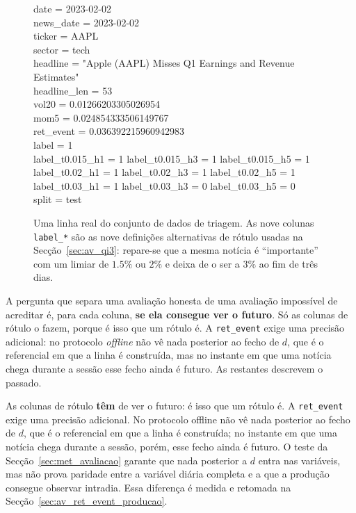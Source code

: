 \begin{figure}[ht]
\centering
\begin{tcolorbox}[colback=black!3, colframe=black!30, boxrule=0.4pt, arc=2pt,
                  width=0.96\textwidth, fontupper=\ttfamily\footnotesize]
date            = 2023-02-02\\
news\_date       = 2023-02-02\\
ticker          = AAPL\\
sector          = tech\\
headline        = "Apple (AAPL) Misses Q1 Earnings and Revenue Estimates"\\
headline\_len    = 53\\
vol20           = 0.01266203305026954\\
mom5            = 0.024854333506149767\\
ret\_event       = 0.036392215960942983\\
label           = 1\\
label\_t0.015\_h1 = 1 \quad label\_t0.015\_h3 = 1 \quad label\_t0.015\_h5 = 1\\
label\_t0.02\_h1  = 1 \quad label\_t0.02\_h3  = 1 \quad label\_t0.02\_h5  = 1\\
label\_t0.03\_h1  = 1 \quad label\_t0.03\_h3  = 0 \quad label\_t0.03\_h5  = 0\\
split           = test
\end{tcolorbox}
\caption[Uma linha do conjunto de treino, inteira]{Uma linha real do conjunto de dados de triagem.
As nove colunas \texttt{label\_*} são as nove definições alternativas de rótulo usadas na
Secção~\ref{sec:av_qi3}: repare-se que a mesma notícia é ``importante'' com um limiar de $1.5\%$
ou $2\%$ e deixa de o ser a $3\%$ ao fim de três dias.}
\label{fig:met_linha}
\end{figure}

A pergunta que separa uma avaliação honesta de uma avaliação impossível de acreditar é, para cada
coluna, \textbf{se ela consegue ver o futuro}. Só as colunas de rótulo o fazem, porque é isso que
um rótulo é. A \texttt{ret\_event} exige uma precisão adicional: no protocolo \emph{offline} não vê
nada posterior ao fecho de $d$, que é o referencial em que a linha é construída, mas no instante em
que uma notícia chega durante a sessão esse fecho ainda é futuro. As restantes descrevem o passado.


As colunas de rótulo \textbf{têm} de ver o futuro: é isso que um rótulo é. A
\texttt{ret\_event} exige uma precisão adicional. No protocolo offline não vê nada posterior ao
fecho de $d$, que é o referencial em que a linha é construída; no instante em que uma notícia chega
durante a sessão, porém, esse fecho ainda é futuro. O teste da Secção~\ref{sec:met_avaliacao}
garante que nada posterior a $d$ entra nas variáveis, mas não prova paridade entre a variável diária
completa e a que a produção consegue observar intradia. Essa diferença é medida e retomada na
Secção~\ref{sec:av_ret_event_producao}.

